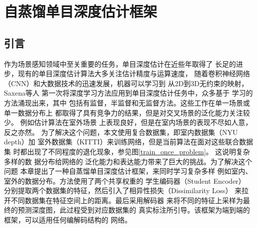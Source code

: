 \chapter{自蒸馏单目深度估计框架}
\section{引言}
作为场景感知领域中至关重要的任务，单目深度估计在近些年取得了
长足的进步，现有的单目深度估计算法大多关注估计精度与运算速度，
随着卷积神经网络（CNN）和大数据技术的迅速发展，机器可以学习到
从2D到3D无约束的映射，Saxena等人\cite{saxena2006learning}
第一次将深度学习方法应用到单目深度估计任务中，众多基于
学习的方法涌现出来\cite{DABC,xu2018structured,chakrabarti2016depth,
bts,2015semantic,lee2019monocular,godard2017unsupervised}，其中
包括有监督，半监督和无监督方法。这些工作在单一场景或单一数据分布上
都取得了具有竞争力的结果，但是对交叉场景的泛化能力关注较少。
例如估计算法在室外场景
上表现良好，但是在室内场景的表现不尽如人意，反之亦然。
为了解决这个问题，本文使用复合数据集，即室内数据集（NYU depth）加
室外数据集（KITTI）来训练网络，但是当前算法在面对这些联合数据集
时都出现了不同程度的退化现象，参见图\ref{train_once_problem}。
这说明复杂多样的数
据分布给网络的
泛化能力和表达能力带来了巨大的挑战。为了解决这个问题
本章提出了一种自蒸馏单目深度估计框架，来同时学习复杂多样
例如室内、室外的数据分布。方法使用了两个共享权重的
学生编码器（Student Encoder）
分别提取两个数据集的特征，然后引入了相异性损失（Dissimilarity 
Loss） 来拉开不同数据集在特征空间上的距离。最后采用解码器
来将不同的特征上采样为最终的预测深度图，此过程受到对应数据集的
真实标注所引导。该框架为端到端的框架，可以适用任何编解码结构的
网络。
